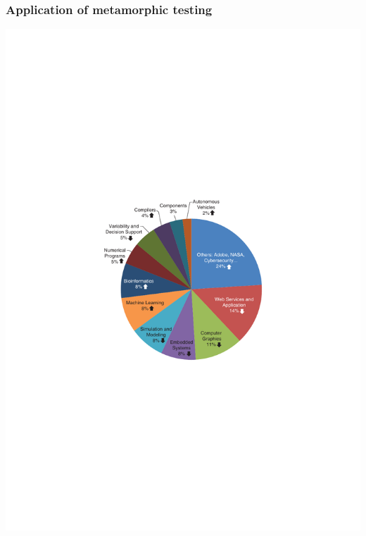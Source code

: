 
\begin{frame}
\frametitle{Application of metamorphic testing}
  \begin{center}
  \includegraphics[width=.65\textwidth]{images/Qualitaetssicherung/abbildungen/MetamorphicTesting}
  \end{center}
\end{frame}


